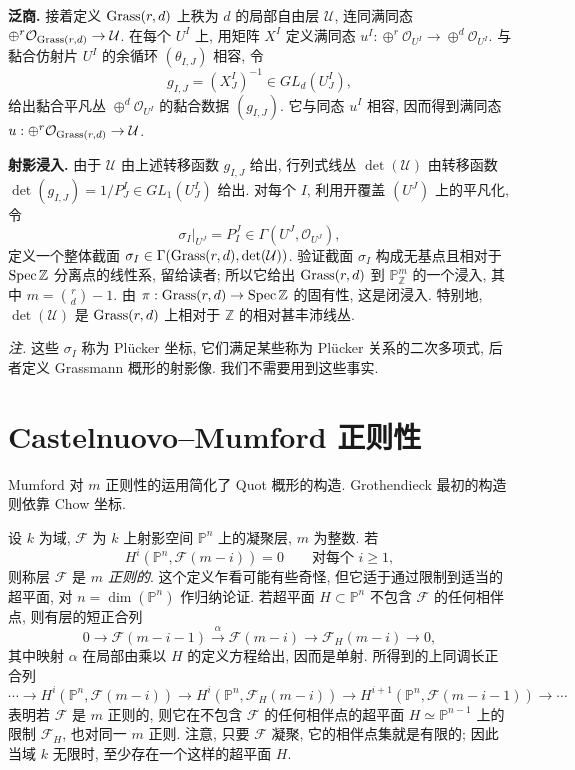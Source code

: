 \textbf{泛商.}
接着定义 $\operatorname{Grass}(r,d)$ 上秩为 $d$ 的局部自由层 $\mathcal U$, 连同满同态 $\oplus^r\mathcal O_{\operatorname{Grass}(r,d)}\to\mathcal U$. 在每个 $U^I$ 上, 用矩阵 $X^I$ 定义满同态 $u^I:\oplus^r\mathcal O_{U^I}\to\oplus^d\mathcal O_{U^I}$. 与黏合仿射片 $U^I$ 的余循环 $(\theta_{I,J})$ 相容, 令
\[
 g_{I,J}=(X^I_J)^{-1}\in GL_d(U^I_J),
\]
给出黏合平凡丛 $\oplus^d\mathcal O_{U^I}$ 的黏合数据 $(g_{I,J})$. 它与同态 $u^I$ 相容, 因而得到满同态 $u:\oplus^r\mathcal O_{\operatorname{Grass}(r,d)}\to\mathcal U$.

\textbf{射影浸入.}
由于 $\mathcal U$ 由上述转移函数 $g_{I,J}$ 给出, 行列式线丛 $\det(\mathcal U)$ 由转移函数 $\det(g_{I,J})=1/P^I_J\in GL_1(U^I_J)$ 给出. 对每个 $I$, 利用开覆盖 $(U^J)$ 上的平凡化, 令
\[
 \sigma_I|_{U^J}=P^J_I\in\Gamma(U^J,\mathcal O_{U^J}),
\]
定义一个整体截面 $\sigma_I\in\Gamma(\operatorname{Grass}(r,d),\det(\mathcal U))$. 验证截面 $\sigma_I$ 构成无基点且相对于 $\operatorname{Spec}\mathbb Z$ 分离点的线性系, 留给读者; 所以它给出 $\operatorname{Grass}(r,d)$ 到 $\mathbb P^m_{\mathbb Z}$ 的一个浸入, 其中 $m=\binom rd-1$. 由 $\pi:\operatorname{Grass}(r,d)\to\operatorname{Spec}\mathbb Z$ 的固有性, 这是闭浸入. 特别地, $\det(\mathcal U)$ 是 $\operatorname{Grass}(r,d)$ 上相对于 $\mathbb Z$ 的相对甚丰沛线丛.

\emph{注.} 这些 $\sigma_I$ 称为 Pl\"ucker 坐标, 它们满足某些称为 Pl\"ucker 关系的二次多项式, 后者定义 Grassmann 概形的射影像. 我们不需要用到这些事实.

\section{Castelnuovo--Mumford 正则性}\label{ch05:sec5.2}
Mumford 对 $m$ 正则性的运用简化了 Quot 概形的构造. Grothendieck 最初的构造则依靠 Chow 坐标.

设 $k$ 为域, $\mathcal F$ 为 $k$ 上射影空间 $\mathbb P^n$ 上的凝聚层, $m$ 为整数. 若
\[
 H^i(\mathbb P^n,\mathcal F(m-i))=0\qquad\text{对每个 }i\geq1,
\]
则称层 $\mathcal F$ 是 \emph{$m$ 正则的}. 这个定义乍看可能有些奇怪, 但它适于通过限制到适当的超平面, 对 $n=\dim(\mathbb P^n)$ 作归纳论证. 若超平面 $H\subset\mathbb P^n$ 不包含 $\mathcal F$ 的任何相伴点, 则有层的短正合列
\[
 0\longrightarrow\mathcal F(m-i-1)\xrightarrow{\alpha}\mathcal F(m-i)
 \longrightarrow\mathcal F_H(m-i)\longrightarrow0,
\]
其中映射 $\alpha$ 在局部由乘以 $H$ 的定义方程给出, 因而是单射. 所得到的上同调长正合列
\[
 \cdots\longrightarrow H^i(\mathbb P^n,\mathcal F(m-i))
 \longrightarrow H^i(\mathbb P^n,\mathcal F_H(m-i))
 \longrightarrow H^{i+1}(\mathbb P^n,\mathcal F(m-i-1))\longrightarrow\cdots
\]
表明若 $\mathcal F$ 是 $m$ 正则的, 则它在不包含 $\mathcal F$ 的任何相伴点的超平面 $H\simeq\mathbb P^{n-1}$ 上的限制 $\mathcal F_H$, 也对同一 $m$ 正则.
注意, 只要 $\mathcal F$ 凝聚, 它的相伴点集就是有限的; 因此当域 $k$ 无限时, 至少存在一个这样的超平面 $H$.

